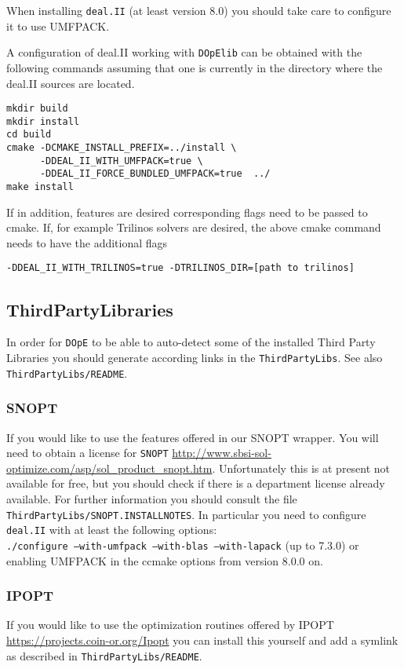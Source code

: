 When installing \texttt{deal.II} (at least version 8.0) you should take care to configure 
it to use UMFPACK.

A configuration of deal.II working with \texttt{DOpElib} can be obtained with
the following commands assuming that one is currently in the 
directory where the deal.II sources are located.
\begin{lstlisting}
mkdir build
mkdir install
cd build
cmake -DCMAKE_INSTALL_PREFIX=../install \ 
      -DDEAL_II_WITH_UMFPACK=true \
      -DDEAL_II_FORCE_BUNDLED_UMFPACK=true  ../
make install
\end{lstlisting}
If in addition, features are desired corresponding flags need to be passed to cmake. If, for 
example Trilinos solvers are desired, the above cmake command needs to have the additional flags

\begin{lstlisting}
-DDEAL_II_WITH_TRILINOS=true -DTRILINOS_DIR=[path to trilinos]
\end{lstlisting}

\subsection{ThirdPartyLibraries}
In order for \texttt{DOpE} to be able to auto-detect some of the installed 
Third Party Libraries you should generate according links in the 
\texttt{ThirdPartyLibs}. See also \texttt{ThirdPartyLibs/README}.

\subsubsection{SNOPT}
If you would like to use the features offered in our SNOPT wrapper. You will 
need to obtain a license for \texttt{SNOPT} 
\url{http://www.sbsi-sol-optimize.com/asp/sol_product_snopt.htm}.
Unfortunately this is at present not available for free, but you should 
check if 
there is a department license already available.
For further information you should consult the file 
\texttt{ThirdPartyLibs/SNOPT.INSTALLNOTES}. In particular you need to configure 
\texttt{deal.II} with at least the following options:\\
\texttt{./configure --with-umfpack --with-blas --with-lapack} (up to 7.3.0)
or enabling UMFPACK in the ccmake options from version 8.0.0 on.




\subsubsection{IPOPT}
If you would like to use the optimization routines offered by IPOPT
\url{https://projects.coin-or.org/Ipopt} you can  
install this yourself and add a symlink as described in \texttt{ThirdPartyLibs/README}.

